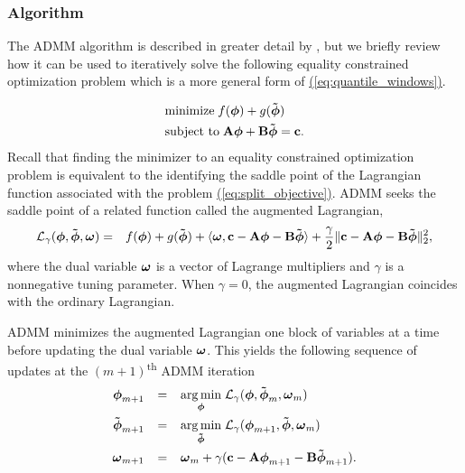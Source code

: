 \documentclass[aoas]{imsart}
\newcommand{\Eqn}[1]{\hyperref[eq:#1]{{\rm (\ref*{eq:#1})}}} %
\newcommand{\Eqn}[1]{{(\ref{eq:#1})}} %
\newcommand{\amp}{\mathop{\:\:\,}\nolimits}
\newcommand{\V}[1]{{\bm{\mathbf{\MakeLowercase{#1}}}}} %
\newcommand{\Vtilde}[1]{{\bm{\tilde \mathbf{\MakeLowercase{#1}}}}} %
\newcommand{\M}[1]{{\bm{\mathbf{\MakeUppercase{#1}}}}} %
\begin{document}
 
\subsubsection{Algorithm}
The ADMM algorithm \citep{gabay1975dual, glowinski1975approximation} is  described in greater detail by \cite{boyd2011distributed}, but we briefly review how it can be used to iteratively solve the following equality constrained optimization problem which is a more general form of \Eqn{quantile_windows}.

\begin{equation}
\label{eq:split_objective}
\begin{split}
&\text{minimize} \; f(\V{\phi}) + g(\Vtilde{\phi}) \\ 
&\text{subject to} \; \M{A}\V{\phi} + \M{B}\Vtilde{\phi} = \V{c}.
\end{split}
\end{equation}
Recall that finding the minimizer to an equality constrained optimization problem is equivalent to the identifying the saddle point of the Lagrangian function associated with the problem \Eqn{split_objective}. ADMM seeks the saddle point of a related function called the augmented Lagrangian,
\begin{eqnarray*}
	\mathcal{L}_{\gamma}(\V{\phi},\Vtilde{\phi},\V{\omega}) & = & f(\V{\phi}) + g(\Vtilde{\phi}) + \langle \V{\omega}, \V{c} - \M{A}\V{\phi} - \M{B}\Vtilde{\phi} \rangle
	+ \frac{\gamma}{2} \lVert \V{c} - \M{A}\V{\phi} - \M{B}\Vtilde{\phi} \rVert_2^2,
\end{eqnarray*}
where the dual variable $\V{\omega}$ is a vector of Lagrange multipliers and $\gamma$ is a nonnegative tuning parameter. When $\gamma = 0$, the augmented Lagrangian coincides with the ordinary Lagrangian.

ADMM minimizes the augmented Lagrangian one block of variables at a time before updating the dual variable $\V{\omega}$. This yields the following sequence of updates at the $(m+1)$\textsuperscript{th} ADMM iteration
\begin{equation}
\label{eq:admm_updates}
\begin{split}
\V{\phi}_{m+1} & \amp = \amp \underset{\V{\phi}}{\arg\min}\; \mathcal{L}_\gamma(\V{\phi},\Vtilde{\phi}_{m}, \V{\omega}_{m}) \\
\Vtilde{\phi}_{m+1} & \amp = \amp \underset{\Vtilde{\phi}}{\arg\min}\; \mathcal{L}_\gamma(\V{\phi}_{m+1},\Vtilde{\phi}, \V{\omega}_{m}) \\
\V{\omega}_{m+1} & \amp = \amp \V{\omega}_{m} + \gamma(\V{c} - \M{A}\V{\phi}_{m+1} - \M{B}\Vtilde{\phi}_{m+1}).
\end{split}
\end{equation}
\end{document}
